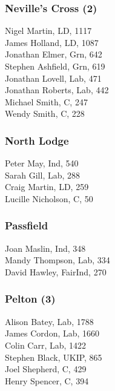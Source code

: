 \documentclass[a4paper,openany,10pt]{book}
\begin{document}
\subsubsection*{Neville's Cross (2)}



Nigel Martin, LD, 1117\\
James Holland, LD, 1087\\
Jonathan Elmer, Grn, 642\\
Stephen Ashfield, Grn, 619\\
Jonathan Lovell, Lab, 471\\
Jonathan Roberts, Lab, 442\\
Michael Smith, C, 247\\
Wendy Smith, C, 228\\


\subsubsection*{North Lodge}



Peter May, Ind, 540\\
Sarah Gill, Lab, 288\\
Craig Martin, LD, 259\\
Lucille Nicholson, C, 50\\


\subsubsection*{Passfield}



Joan Maslin, Ind, 348\\
Mandy Thompson, Lab, 334\\
David Hawley, FairInd, 270\\


\subsubsection*{Pelton (3)}



Alison Batey, Lab, 1788\\
James Cordon, Lab, 1660\\
Colin Carr, Lab, 1422\\
Stephen Black, UKIP, 865\\
Joel Shepherd, C, 429\\
Henry Spencer, C, 394\\
\end{document}
